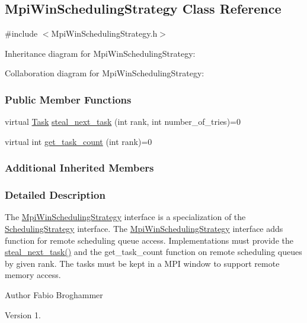 \hypertarget{a00058}{}\subsection{Mpi\+Win\+Scheduling\+Strategy Class Reference}
\label{a00058}


{\ttfamily \#include $<$Mpi\+Win\+Scheduling\+Strategy.\+h$>$}



Inheritance diagram for Mpi\+Win\+Scheduling\+Strategy\+:


Collaboration diagram for Mpi\+Win\+Scheduling\+Strategy\+:
\subsubsection*{Public Member Functions}
\begin{DoxyCompactItemize}
\item 
virtual \hyperlink{a00002}{Task} \hyperlink{a00058_ac1804574e61c9ed91c7f78bc48b332ea}{steal\+\_\+next\+\_\+task} (int rank, int number\+\_\+of\+\_\+tries)=0
\item 
virtual int \hyperlink{a00058_a8742d0d3a2204efe5aa47e39f856dee1}{get\+\_\+task\+\_\+count} (int rank)=0
\end{DoxyCompactItemize}
\subsubsection*{Additional Inherited Members}


\subsubsection{Detailed Description}
The \hyperlink{a00058}{Mpi\+Win\+Scheduling\+Strategy} interface is a specialization of the \hyperlink{a00076}{Scheduling\+Strategy} interface. The \hyperlink{a00058}{Mpi\+Win\+Scheduling\+Strategy} interface adds function for remote scheduling queue access. Implementations must provide the \hyperlink{a00058_ac1804574e61c9ed91c7f78bc48b332ea}{steal\+\_\+next\+\_\+task()} and the get\+\_\+task\+\_\+count function on remote scheduling queues by given rank. The tasks must be kept in a M\+P\+I window to support remote memory access.

\begin{DoxyAuthor}{Author}
Fabio Broghammer 
\end{DoxyAuthor}
\begin{DoxyVersion}{Version}
1. 
\end{DoxyVersion}


